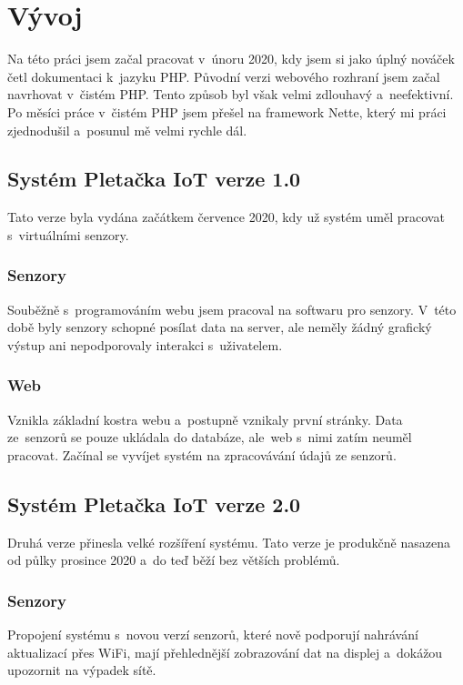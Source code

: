\chapter{Vývoj}
Na této práci jsem začal pracovat v~únoru 2020, kdy jsem si jako úplný nováček četl dokumentaci k~jazyku PHP. 
Původní verzi webového rozhraní jsem začal navrhovat v~čistém PHP. Tento způsob byl však velmi zdlouhavý a~neefektivní.
Po měsíci práce v~čistém PHP jsem přešel na framework Nette, který mi práci zjednodušil a~posunul mě velmi rychle dál. 


\section{Systém Pletačka IoT verze 1.0}
Tato verze byla vydána začátkem července 2020, kdy už systém uměl pracovat s~virtuálními senzory.


\subsection{Senzory}
Souběžně s~programováním webu jsem pracoval na softwaru pro senzory.
V~této době byly senzory schopné posílat data na server, ale neměly žádný grafický výstup ani nepodporovaly interakci s~uživatelem.

\subsection{Web}
Vznikla základní kostra webu a~postupně vznikaly první stránky.
Data ze~senzorů se pouze ukládala do databáze, ale~web s~nimi zatím neuměl pracovat.
Začínal se vyvíjet systém na zpracovávání údajů ze senzorů.



\section{Systém Pletačka IoT verze 2.0}
Druhá verze přinesla velké rozšíření systému.
Tato verze je produkčně nasazena od půlky prosince 2020 a~do teď běží bez větších problémů.


\subsection{Senzory}
Propojení systému s~novou verzí senzorů, které nově podporují nahrávání aktualizací přes WiFi, mají přehlednější zobrazování dat na displej a~dokážou upozornit na výpadek sítě.



